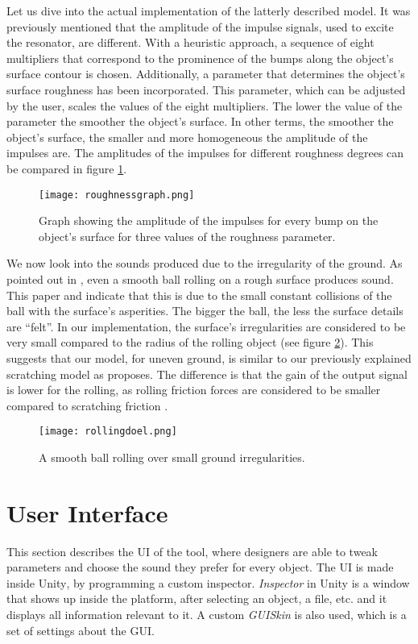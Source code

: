 Let us dive into the actual implementation of the latterly described model. It was previously mentioned that the amplitude of the impulse signals, used to excite the resonator, are different. With a heuristic approach, a sequence of eight multipliers that correspond to the prominence of the bumps along the object's surface contour is chosen. Additionally, a parameter that determines the object's surface roughness has been incorporated. This parameter, which can be adjusted by the user, scales the values of the eight multipliers. The lower the value of the parameter the smoother the object's surface. In other terms, the smoother the object's surface, the smaller and more homogeneous the amplitude of the impulses are. The amplitudes of the impulses for different roughness degrees can be compared in figure  \ref{fig:roughnessgraph}.

\begin{figure}[H]
  \centering
    \texttt{[image: roughnessgraph.png]}
      \caption{Graph showing the amplitude of the impulses for every bump on the object's surface for three values of the roughness parameter.}
      \label{fig:roughnessgraph}
\end{figure} 

We now look into the sounds produced due to the irregularity of the ground. As pointed out in \cite{van2001foleyautomatic}, even a smooth ball rolling on a rough surface produces sound. This paper and \cite{rath2003expressive} indicate that this is due to the small constant collisions of the ball with the surface's asperities. The bigger the ball, the less the surface details are ``felt''. In our implementation, the surface's irregularities are considered to be very small compared to the radius of the rolling object (see figure \ref{fig:rollingdoel}). This suggests that our model, for uneven ground, is similar to our previously explained scratching model as \cite{van2001foleyautomatic} proposes. The difference is that the gain of the output signal is lower for the rolling, as rolling friction forces are considered to be smaller compared to scratching friction \cite{mehtas}.

\begin{figure}[H]
  \centering
    \texttt{[image: rollingdoel.png]}
      \caption{A smooth ball rolling over small ground irregularities.}
      \label{fig:rollingdoel}
\end{figure} 



\section{User Interface}\label{sec:UI}
This section describes the \gls{UI} of the tool, where designers are able to tweak parameters and choose the sound they prefer for every object. The \gls{UI} is made inside Unity\textsuperscript{\textregistered}, by programming a custom inspector. \textit{Inspector} in Unity\textsuperscript{\textregistered} is a window that shows up inside the platform, after selecting an object, a file, etc. and it displays all information relevant to it. A custom \textit{GUISkin} is also used, which is a set of settings about the \gls{GUI}. 

